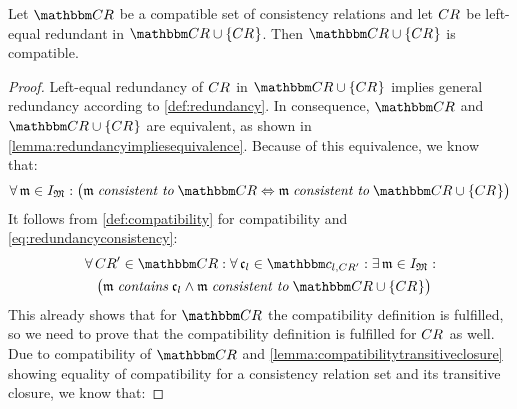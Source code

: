 \begin{theorem} \label{theorem:redundancycompatibility}
    Let $\consistencyrelationset{CR}$ be a compatible set of consistency relations and let $\consistencyrelation{CR}{}$ be left-equal redundant in $\consistencyrelationset{CR} \cup \setted{\consistencyrelation{CR}{}}$. Then $\consistencyrelationset{CR} \cup \setted{\consistencyrelation{CR}{}}$ is compatible. 
\end{theorem}

\begin{proof}
    Left-equal redundancy of $\consistencyrelation{CR}{}$ in $\consistencyrelationset{CR} \cup \setted{\consistencyrelation{CR}{}}$ implies general redundancy according to \autoref{def:redundancy}. In consequence, $\consistencyrelationset{CR}$ and $\consistencyrelationset{CR} \cup \setted{\consistencyrelation{CR}{}}$ are equivalent, as shown in \autoref{lemma:redundancyimpliesequivalence}.
    Because of this equivalence, we know that:
    \begin{equation} \label{eq:redundancyconsistency}
        \forall \modeltuple{m} \in \metamodeltupleinstanceset{M}: 
        \big(
            \modeltuple{m} \consistenttomath \consistencyrelationset{CR} \equivalent 
            \modeltuple{m} \consistenttomath \consistencyrelationset{CR} \cup \setted{\consistencyrelation{CR}{}} 
        \big)
    \end{equation}
    It follows from \autoref{def:compatibility} for compatibility and \autoref{eq:redundancyconsistency}:
    \begin{align} \label{eq:redundancycompatibleexisting}
        & \nonumber
        \forall \consistencyrelation{CR}{}' \in \consistencyrelationset{CR} : \forall \conditionelement{c}{l} \in \condition{c}{l, \consistencyrelation{CR}{}'}
        : \exists \modeltuple{m} \in \metamodeltupleinstanceset{M} : \\
        & \formulaskip
        \big(
            \modeltuple{m} \containsmath \conditionelement{c}{l} \land \modeltuple{m} \consistenttomath \consistencyrelationset{CR} \cup \setted{\consistencyrelation{CR}{}} 
        \big)
    \end{align}
    This already shows that for $\consistencyrelationset{CR}$ the compatibility definition is fulfilled, so we need to prove that the compatibility definition is fulfilled for $\consistencyrelation{CR}{}$ as well.
    Due to compatibility of $\consistencyrelationset{CR}$ and \autoref{lemma:compatibilitytransitiveclosure} showing equality of compatibility for a consistency relation set and its transitive closure, we know that:

\end{proof}
